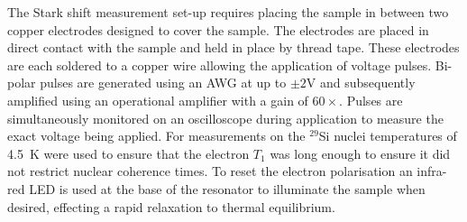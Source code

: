 The Stark shift measurement set-up requires placing the sample in between two copper electrodes designed to cover the sample.
The electrodes are placed in direct contact with the sample and held in place by thread tape.
These electrodes are each soldered to a copper wire allowing the application of voltage pulses.
Bi-polar pulses are generated using an AWG at up to $\pm2$V and subsequently amplified using an operational amplifier with a gain of $60\times$.
Pulses are simultaneously monitored on an oscilloscope during application to measure the exact voltage being applied.
For measurements on the $^{29}$Si nuclei temperatures of 4.5~K were used to ensure that the electron $T_1$ was long enough to ensure it did not restrict nuclear coherence times.
To reset the electron polarisation an infra-red LED is used at the base of the resonator to illuminate the sample when desired, effecting a rapid relaxation to thermal equilibrium.


